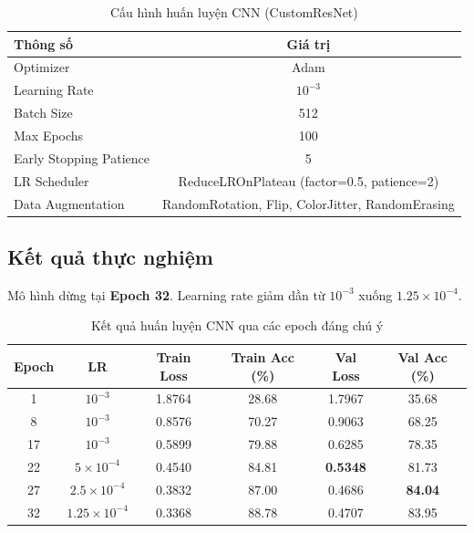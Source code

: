 \documentclass[a4paper]{article}
\theoremstyle{definition}
\begin{document}
\begin{table}[H]
	\centering
	\caption{Cấu hình huấn luyện CNN (CustomResNet)}
	\begin{tabular}{|l|c|}
		\hline
		\textbf{Thông số}          & \textbf{Giá trị} \\ \hline
		Optimizer                  & Adam \\ \hline
		Learning Rate              & $10^{-3}$ \\ \hline
		Batch Size                 & 512 \\ \hline
		Max Epochs                 & 100 \\ \hline
		Early Stopping Patience    & 5 \\ \hline
		LR Scheduler               & ReduceLROnPlateau (factor=0.5, patience=2) \\ \hline
		Data Augmentation          & RandomRotation, Flip, ColorJitter, RandomErasing \\ \hline
	\end{tabular}
	\label{tab:cnn-config}
\end{table}

\subsection{Kết quả thực nghiệm}

Mô hình dừng tại \textbf{Epoch 32}. Learning rate giảm dần từ $10^{-3}$ xuống $1.25 \times 10^{-4}$.

\begin{table}[H]
	\centering
	\caption{Kết quả huấn luyện CNN qua các epoch đáng chú ý}
	\footnotesize
	\begin{tabular}{|c|c|c|c|c|c|}
		\hline
		\textbf{Epoch} & \textbf{LR} & \textbf{Train Loss} & \textbf{Train Acc (\%)} & \textbf{Val Loss} & \textbf{Val Acc (\%)} \\ \hline
		1   & $10^{-3}$              & 1.8764 & 28.68 & 1.7967 & 35.68 \\ \hline
		8   & $10^{-3}$              & 0.8576 & 70.27 & 0.9063 & 68.25 \\ \hline
		17  & $10^{-3}$              & 0.5899 & 79.88 & 0.6285 & 78.35 \\ \hline
		22  & $5 \times 10^{-4}$     & 0.4540 & 84.81 & \textbf{0.5348} & 81.73 \\ \hline
		27  & $2.5 \times 10^{-4}$   & 0.3832 & 87.00 & 0.4686 & \textbf{84.04} \\ \hline
		32  & $1.25 \times 10^{-4}$  & 0.3368 & 88.78 & 0.4707 & 83.95 \\ \hline
	\end{tabular}
	\label{tab:cnn-results}
\end{table}
\end{document}
